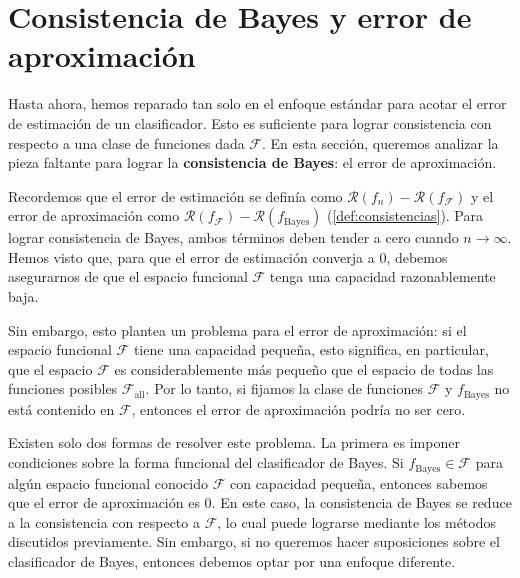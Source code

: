 \documentclass{article}
\begin{document}
    












\section{Consistencia de Bayes y error de aproximación}

Hasta ahora, hemos reparado tan solo en el enfoque estándar para acotar el error de estimación 
de un clasificador. Esto es suficiente para lograr consistencia con respecto a una clase de funciones 
dada \(\mathcal{F}\). En esta sección, queremos analizar la pieza faltante para lograr la 
\textbf{consistencia de Bayes}: el error de aproximación.\newline

Recordemos que el error de estimación se definía como \(\mathcal{R}(f_n) - \mathcal{R}(f_{\mathcal{F}})\) 
y el error de aproximación como \(\mathcal{R}(f_{\mathcal{F}}) - \mathcal{R}(f_{\text{Bayes}})\) 
(\ref{def:consistencias}). Para lograr consistencia de Bayes, ambos términos deben tender a cero cuando 
\(n \to \infty\). Hemos visto que, para que el error de estimación converja a \(0\), debemos 
asegurarnos de que el espacio funcional \(\mathcal{F}\) tenga una capacidad razonablemente baja.\newline

Sin embargo, esto plantea un problema para el error de aproximación: si el espacio funcional 
\(\mathcal{F}\) tiene una capacidad pequeña, esto significa, en particular, que el espacio 
\(\mathcal{F}\) es considerablemente más pequeño que el espacio de todas las funciones posibles 
\(\mathcal{F}_{\text{all}}\). Por lo tanto, si fijamos la clase de funciones \(\mathcal{F}\) y 
\(f_{\text{Bayes}}\) no está contenido en \(\mathcal{F}\), entonces el 
error de aproximación podría no ser cero.\newline

Existen solo dos formas de resolver este problema. La primera es imponer condiciones sobre la 
forma funcional del clasificador de Bayes. Si \(f_{\text{Bayes}} \in \mathcal{F}\) para algún 
espacio funcional conocido \(\mathcal{F}\) con capacidad pequeña, entonces sabemos que el error 
de aproximación es \(0\). En este caso, la consistencia de Bayes se reduce a la consistencia con 
respecto a \(\mathcal{F}\), lo cual puede lograrse mediante los métodos discutidos previamente. 
Sin embargo, si no queremos hacer suposiciones sobre el clasificador de Bayes, entonces 
debemos optar por una enfoque diferente.\newline
\end{document}
